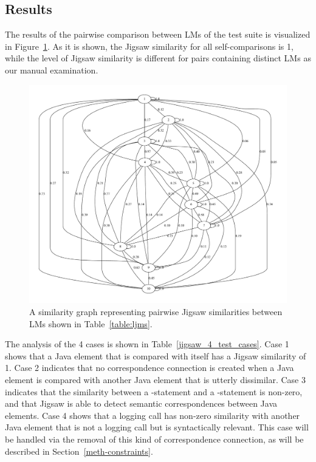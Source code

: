 \subsection{Results}  \label{study1-results}
The results of the pairwise comparison between LMs of the test suite is visualized in Figure~\ref{fig:jigsaw_graph}. As it is shown, the Jigsaw similarity for all self-comparisons is 1, while  the level of Jigsaw similarity is different for pairs containing distinct LMs as our manual examination.

\begin{figure} [H]
  \centering\includegraphics [width = \textwidth]{graphviz/jigsaw.pdf}
  \caption{A similarity graph representing pairwise Jigsaw similarities between LMs shown in Table~\ref{table:ljms}.}
  \label{fig:jigsaw_graph}
\end{figure}


The analysis of the 4 cases is shown in Table~\ref{jigsaw_4_test_cases}. Case 1 shows that a Java element that is compared with itself has a Jigsaw similarity of 1. Case 2 indicates that no correspondence connection is created when a Java element is compared with another Java element that is utterly dissimilar. Case 3 indicates that the similarity between a -statement and a -statement is non-zero, and that Jigsaw is able to detect semantic correspondences between Java elements. Case 4 shows that a logging call has non-zero similarity with another Java element that is not a logging call but is syntactically relevant. This case will be handled via the removal of this kind of correspondence connection, as will be described in Section~\ref{meth-constraints}. 

